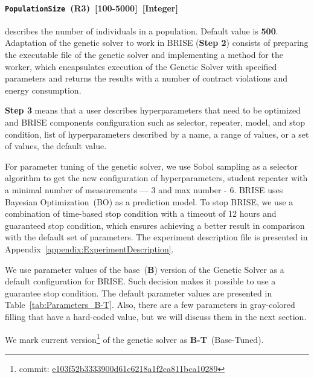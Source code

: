 \paragraph{\texttt{PopulationSize}~(R3)~[100-5000]~[Integer]} describes the number of individuals in a population. Default value is \textbf{500}. \\

Adaptation of the genetic solver to work in BRISE (\textbf{Step 2}) consists of preparing the executable file of the genetic solver and implementing a method for the worker, which encapsulates execution of the Genetic Solver with specified parameters and returns the results with a number of contract violations and energy consumption.

\textbf{Step 3} means that a user describes hyperparameters that need to be optimized and BRISE components configuration such as selector, repeater, model, and stop condition, list of hyperparameters described by a name, a range of values, or a set of values, the default value.

For parameter tuning of the genetic solver, we use Sobol sampling as a selector algorithm to get the new configuration of hyperparameters, student repeater with a minimal number of measurements — 3 and max number - 6. BRISE uses Bayesian Optimization~(BO) as a prediction model.
To stop BRISE, we use a combination of time-based stop condition with a timeout of 12 hours and guaranteed stop condition, which ensures achieving a better result in comparison with the default set of parameters. The experiment description file is presented in Appendix~\ref{appendix:ExperimentDescription}.

We use parameter values of the base~(\textbf{B}) version of the Genetic Solver as a default configuration for BRISE. Such decision makes it possible to use a guarantee stop condition. The default parameter values are presented in Table~\ref{tab:Parameters_B-T}. Also, there are a few parameters in gray-colored filling that have a hard-coded value, but we will discuss them in the next section. 

We mark current version\footnote{commit: \href{https://git-st.inf.tu-dresden.de/mquat/mquat2/commit/e103f52b3333900d61c6218a1f2ca811bca10289}{e103f52b3333900d61c6218a1f2ca811bca10289}} of the genetic solver as \textbf{B-T}~(Base-Tuned).


